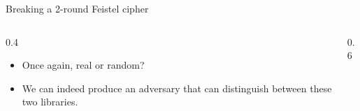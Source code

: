 \ifdefined\PRESENTATION\else\PassOptionsToClass{handout}{beamer}\fi\documentclass[aspectratio=169, lualatex]{beamer}
\begin{document}
\begin{frame}{Breaking a 2-round Feistel cipher}
	\begin{columns}[c]
		\begin{column}{0.4\textwidth}
			\begin{itemize}
				\item Once again, real or random?
				\item We can indeed produce an adversary \prog{} that can distinguish between these two libraries.
			\end{itemize}
		\end{column}
		\begin{column}{0.6\textwidth}
			\begin{center}
			\end{center}
		\end{column}
	\end{columns}
\end{frame}
\end{document}
